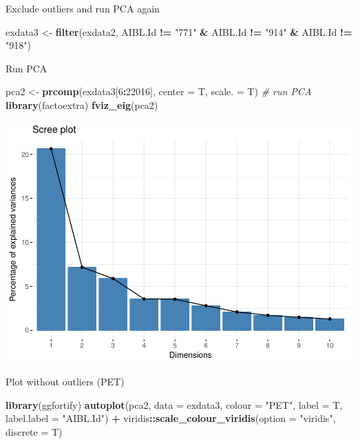\documentclass[]{article}
\newenvironment{Shaded}{\begin{snugshade}}{\end{snugshade}}
\newcommand{\KeywordTok}[1]{\textcolor[rgb]{0.13,0.29,0.53}{\textbf{#1}}}
\newcommand{\DataTypeTok}[1]{\textcolor[rgb]{0.13,0.29,0.53}{#1}}
\newcommand{\DecValTok}[1]{\textcolor[rgb]{0.00,0.00,0.81}{#1}}
\newcommand{\StringTok}[1]{\textcolor[rgb]{0.31,0.60,0.02}{#1}}
\newcommand{\CommentTok}[1]{\textcolor[rgb]{0.56,0.35,0.01}{\textit{#1}}}
\newcommand{\OperatorTok}[1]{\textcolor[rgb]{0.81,0.36,0.00}{\textbf{#1}}}
\newcommand{\NormalTok}[1]{#1}
\begin{document}
Exclude outliers and run PCA again

\begin{Shaded}
\begin{Highlighting}[]
\NormalTok{exdata3 <-}\StringTok{ }\KeywordTok{filter}\NormalTok{(exdata2, AIBL.Id }\OperatorTok{!=}\StringTok{ "771"} \OperatorTok{&}\StringTok{ }\NormalTok{AIBL.Id }\OperatorTok{!=}\StringTok{ "914"} \OperatorTok{&}\StringTok{ }\NormalTok{AIBL.Id }\OperatorTok{!=}\StringTok{ "918"}\NormalTok{)}
\end{Highlighting}
\end{Shaded}

Run PCA

\begin{Shaded}
\begin{Highlighting}[]
\NormalTok{pca2 <-}\StringTok{ }\KeywordTok{prcomp}\NormalTok{(exdata3[}\DecValTok{6}\OperatorTok{:}\DecValTok{22016}\NormalTok{], }\DataTypeTok{center =}\NormalTok{ T, }\DataTypeTok{scale. =}\NormalTok{ T) }\CommentTok{# run PCA}
\KeywordTok{library}\NormalTok{(factoextra)}
\KeywordTok{fviz_eig}\NormalTok{(pca2)}
\end{Highlighting}
\end{Shaded}

\includegraphics{20180125_summary_to_date_files/figure-latex/unnamed-chunk-72-1.pdf}

Plot without outliers (PET)

\begin{Shaded}
\begin{Highlighting}[]
\KeywordTok{library}\NormalTok{(ggfortify)}
\KeywordTok{autoplot}\NormalTok{(pca2, }\DataTypeTok{data =}\NormalTok{ exdata3, }\DataTypeTok{colour =} \StringTok{"PET"}\NormalTok{, }\DataTypeTok{label =}\NormalTok{ T, }\DataTypeTok{label.label =} \StringTok{"AIBL.Id"}\NormalTok{) }\OperatorTok{+}
\StringTok{  }\NormalTok{viridis}\OperatorTok{::}\KeywordTok{scale_colour_viridis}\NormalTok{(}\DataTypeTok{option =} \StringTok{"viridis"}\NormalTok{, }\DataTypeTok{discrete =}\NormalTok{ T)}
\end{Highlighting}
\end{Shaded}
\end{document}
